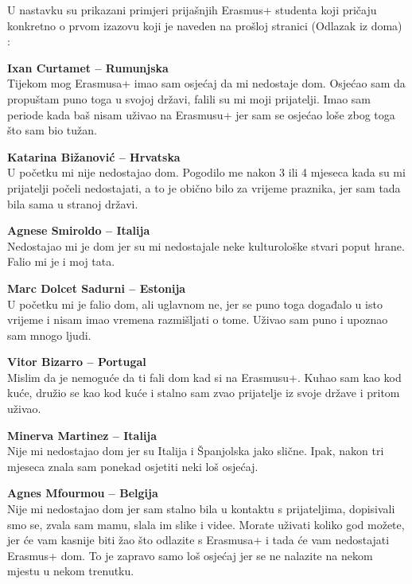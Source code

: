 \documentclass[]{foi}
\begin{document}
U nastavku su prikazani primjeri prijašnjih Erasmus+ studenta koji pričaju konkretno o prvom izazovu koji je naveden na prošloj stranici (Odlazak iz doma) \cite{erasmus_homesick_video_2024}:

\textbf{Ixan Curtamet – Rumunjska} \\
Tijekom mog Erasmusa+ imao sam osjećaj da mi nedostaje dom. Osjećao sam da propuštam puno toga u svojoj državi, falili su mi moji prijatelji. Imao sam periode kada baš nisam uživao na Erasmusu+ 
jer sam se osjećao loše zbog toga što sam bio tužan.

\vspace{1em}

\textbf{Katarina Bižanović – Hrvatska} \\
U početku mi nije nedostajao dom. Pogodilo me nakon 3 ili 4 mjeseca kada su mi prijatelji počeli nedostajati, a to je obično bilo za vrijeme praznika, jer sam tada bila sama u stranoj državi.

\vspace{1em}

\textbf{Agnese Smiroldo – Italija} \\
Nedostajao mi je dom jer su mi nedostajale neke kulturološke stvari poput hrane. Falio mi je i moj tata.

\vspace{1em}

\textbf{Marc Dolcet Sadurni – Estonija} \\
U početku mi je falio dom, ali uglavnom ne, jer se puno toga događalo u isto vrijeme i nisam imao vremena razmišljati o tome. Uživao sam puno i upoznao sam mnogo ljudi.

\vspace{1em}

\textbf{Vitor Bizarro – Portugal} \\
Mislim da je nemoguće da ti fali dom kad si na Erasmusu+. Kuhao sam kao kod kuće, družio se kao kod kuće i stalno sam zvao prijatelje iz svoje države i pritom uživao.

\vspace{1em}

\textbf{Minerva Martinez – Italija} \\
Nije mi nedostajao dom jer su Italija i Španjolska jako slične. Ipak, nakon tri mjeseca znala sam ponekad osjetiti neki loš osjećaj.

\vspace{1em}

\textbf{Agnes Mfourmou – Belgija} \\
Nije mi nedostajao dom jer sam stalno bila u kontaktu s prijateljima, dopisivali smo se, zvala sam mamu, slala im slike i videe. Morate uživati koliko god možete, 
jer će vam kasnije biti žao što odlazite s Erasmusa+ i tada će vam nedostajati Erasmus+ dom. To je zapravo samo loš osjećaj jer se ne nalazite na nekom mjestu u nekom trenutku.
\end{document}
